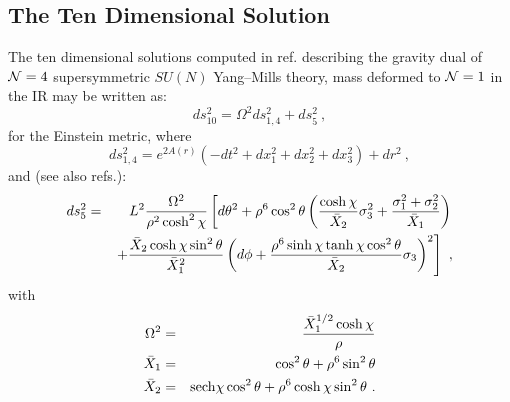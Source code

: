 \documentclass[a4paper,12pt]{article}
\newcommand{\labell}[1]{\label{#1}}
\begin{document}
\subsection{The Ten Dimensional Solution}  
\label{tendee}  
The ten dimensional solutions computed in ref.\cite{pw2} describing
the gravity dual of ${\cal N}=4$ supersymmetric $SU(N)$ Yang--Mills
theory, mass deformed to ${\cal N}=1$ in the IR may be written as:
\begin{equation}  
ds^2_{10}=\Omega^2 ds^2_{1,4}+ds^2_{5}\ ,  
\labell{fullmetric}  
\end{equation}  
for the Einstein metric, where  
\begin{equation}  
ds^2_{1,4}=e^{2A(r)}\left(-dt^2+dx_1^2+dx_2^2+dx_3^2\right)+dr^2\ ,  
\labell{littlemetric}  
\end{equation}  
and (see also refs.\cite{cvetic,pilch}):  
\begin{eqnarray}  
ds_5^2&=&{L^2}{\Omega^2\over\rho^2\cosh^2\chi}\left[{d\theta^2}
+\rho^6\cos^2\theta\left({\cosh\chi\over   
    {\bar X}_2}\sigma_3^2+{\sigma_1^2+\sigma_2^2\over 
{\bar X}_1}\right)\right.\nonumber\\  
&&\left.+{{\bar X}_2\cosh\chi\sin^2\theta\over {\bar X}^2_1} \left({d\phi}
+{\rho^{6}\sinh\chi \tanh\chi \cos^2\theta\over {\bar X}_2}
\sigma_3\right)^2\right]\ ,  
\labell{bigmetric}  
\end{eqnarray}  
with  
\begin{eqnarray}  
\Omega^2&=&{{\bar X}_1^{1/2}\cosh\chi\over \rho}\nonumber\\  
{\bar X}_1&=&\cos^2\theta+\rho^6\sin^2\theta\nonumber\\  
{\bar X}_2&=&{\rm sech}\chi\cos^2\theta+\rho^6\cosh\chi\sin^2\theta\ .  
\labell{warp}  
\end{eqnarray}  
\end{document}

